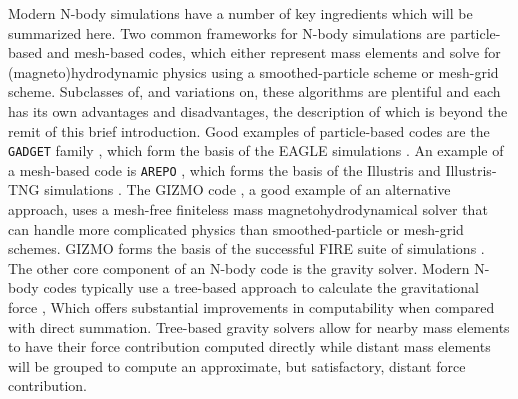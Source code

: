 Modern N-body simulations have a number of key ingredients which will be summarized here. Two common frameworks for N-body simulations are particle-based and mesh-based codes, which either represent mass elements and solve for (magneto)hydrodynamic physics using a smoothed-particle scheme or mesh-grid scheme. Subclasses of, and variations on, these algorithms are plentiful and each has its own advantages and disadvantages, the description of which is beyond the remit of this brief introduction. Good examples of particle-based codes are the \texttt{GADGET} family \parencite{gadget2_springel05,gadget4_springel21}, which form the basis of the EAGLE simulations \parencite{schaye15}. An example of a mesh-based code is \texttt{AREPO} \parencite{arepo_springel10}, which forms the basis of the Illustris and Illustris-TNG simulations \parencite{illustris_vogelsberger14,tng_model_pillepich18}. The GIZMO code \parencite{gizmo_hopkins15}, a good example of an alternative approach, uses a mesh-free finiteless mass magnetohydrodynamical solver that can handle more complicated physics than smoothed-particle or mesh-grid schemes. GIZMO forms the basis of the successful FIRE suite of simulations \parencite{wetzel16,FIRE2_model_hopkins18}. The other core component of an N-body code is the gravity solver. Modern N-body codes typically use a tree-based approach to calculate the gravitational force \parencite[e.g.][]{barnes86}, Which offers substantial improvements in computability when compared with direct summation. Tree-based gravity solvers allow for nearby mass elements to have their force contribution computed directly while distant mass elements will be grouped to compute an approximate, but satisfactory, distant force contribution.

